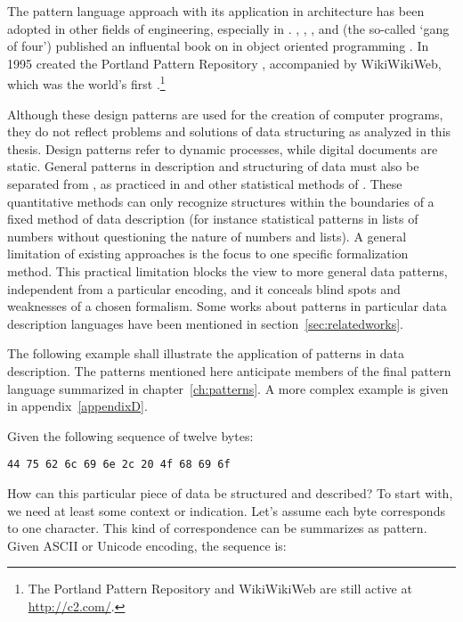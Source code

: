 The pattern language approach with its application in architecture has been
adopted in other fields of engineering, especially in  \cite{Beck1987}.  , ,
, and  (the so-called `gang of
four') published an influental book on  in object
oriented programming \cite{Gamma1994}.  In 1995 
created the Portland Pattern Repository \cite{Cunnigham1995}, accompanied by
WikiWikiWeb, which was the world's first .\footnote{The Portland
Pattern Repository and WikiWikiWeb are still active at \url{http://c2.com/}.}

Although these design patterns are used for the creation of computer programs,
they do not reflect problems and solutions of data structuring as analyzed in
this thesis. Design patterns refer to dynamic processes, while digital documents
are static.  General patterns in description and structuring of data must also
be separated from , as practiced in  and other statistical methods of . These
quantitative methods can only recognize structures within the boundaries of a
fixed method of data description (for instance statistical patterns in lists of
numbers without questioning the nature of numbers and lists). A general
limitation of existing approaches is the focus to one specific formalization
method. This practical limitation blocks the view to more general data
patterns, independent from a particular encoding, and it conceals blind spots
and weaknesses of a chosen formalism. Some works about patterns in particular
data description languages have been mentioned in
section~\ref{sec:relatedworks}.


The following example shall illustrate the application of patterns in data
description. The patterns mentioned here anticipate members of the final
pattern language summarized in chapter~\ref{ch:patterns}. A more complex
example is given in appendix~\ref{appendixD}.

Given the following sequence of twelve bytes: 

\begin{center}
\verb|44 75 62 6c 69 6e 2c 20 4f 68 69 6f|\\
\end{center}

\noindent How can this particular piece of data be structured and described? To
start with, we need at least some context or indication. Let's assume each byte
corresponds to one character. This kind of correspondence can be summarizes as
 pattern. Given ASCII or Unicode encoding, the sequence is:

